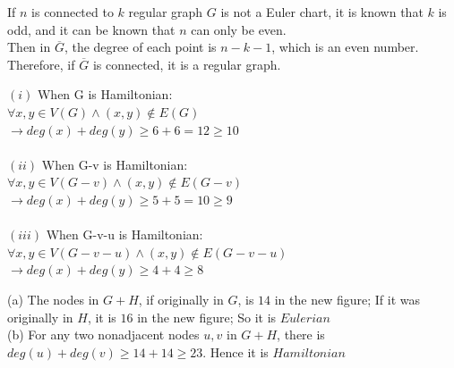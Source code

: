 \documentclass[a4paper, justified]{tufte-handout}
\begin{document}
\begin{problem}[CZ 6.6]
\end{problem}

\begin{solution}
  If $n$ is connected to $k$ regular graph $G$ is not a Euler chart, it is known that $k$ is odd, and it can be known that $n$ can only be even. \\
  Then in $\overline {G}$, the degree of each point is $n-k-1$, which is an even number. \\
  Therefore, if $\overline {G}$ is connected, it is a regular graph.
\end{solution}

\begin{problem}[CZ 6.10]
\end{problem}

\begin{solution}
  $(i)$ When G is Hamiltonian: \\
  $\forall x, y \in V(G) \land (x,y) \notin E(G)$\\
  $\rightarrow deg(x)+ deg(y) \geq 6+ 6 = 12 \geq 10$\\
  \\
  $(ii)$ When G-v is Hamiltonian: \\
  $\forall x, y \in V(G-v) \land (x,y) \notin E(G-v)$ \\
  $\rightarrow deg(x)+ deg(y) \geq 5 + 5 = 10 \geq 9$\\
  \\
  $(iii)$ When G-v-u is Hamiltonian: \\
  $\forall x, y \in V(G-v-u)\land (x,y) \notin E(G-v-u)$\\
  $\rightarrow deg(x)+ deg(y) \geq 4 + 4 \geq 8$
\end{solution}

\begin{problem}[CZ 6.12]
\end{problem}

\begin{solution}
  (a)
  The nodes in $G+H$, if originally in $G$, is $14$ in the new figure; If it was originally in $H$, it is $16$ in the new figure; So it is $Eulerian$\\
  (b)
  For any two nonadjacent nodes $u,v$ in $G+H$, there is $deg(u)+deg(v)\geq 14+14\geq23$. Hence it is $ Hamiltonian$
\end{solution}

\begin{problem}[CZ 6.20]
\end{problem}
\end{document}
